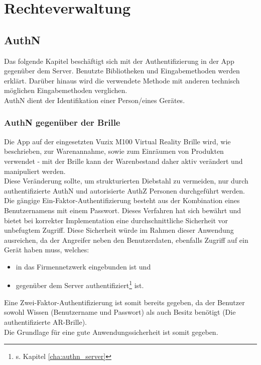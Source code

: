 \section{Rechteverwaltung}
\label{cha:rechteverwaltung_vr}

\subsection{\acf{AuthN}}
Das folgende Kapitel beschäftigt sich mit der Authentifizierung in der App gegenüber dem Server. Benutzte Bibliotheken und Eingabemethoden werden erklärt. Darüber hinaus wird die verwendete Methode mit anderen technisch möglichen Eingabemethoden verglichen.\\

\acl{AuthN} dient der Identifikation einer Person/eines Gerätes.

\subsubsection{\acs{AuthN} gegenüber der Brille}
Die App auf der eingesetzten Vuzix M100 Virtual Reality Brille wird, wie beschrieben, zur Warenannahme, sowie zum Einräumen von Produkten verwendet - mit der Brille kann der Warenbestand daher aktiv verändert und manipuliert werden.\\
Diese Veränderung sollte, um \zB strukturierten Diebstahl zu vermeiden, nur durch authentifizierte \acs{AuthN} und autorisierte \acs{AuthZ} Personen durchgeführt werden.\\

Die gängige Ein-Faktor-Authentifizierung besteht aus der Kombination eines Benutzernamens mit einem Passwort. Dieses Verfahren hat sich bewährt und bietet bei korrekter Implementation eine durchschnittliche Sicherheit vor unbefugtem Zugriff. Diese Sicherheit würde im Rahmen dieser Anwendung ausreichen, da der Angreifer neben den Benutzerdaten, ebenfalls Zugriff auf ein Gerät haben muss, welches:
\begin{itemize}
	\item in das Firmennetzwerk eingebunden ist und
	\item gegenüber dem Server authentifiziert\footnote{s. Kapitel \ref{cha:authn_server}} ist.
\end{itemize}
Eine Zwei-Faktor-Authentifizierung ist somit bereits gegeben, da der Benutzer sowohl Wissen (Benutzername und Passwort) als auch Besitz benötigt (Die authentifizierte \acl{AR}-Brille).\\
Die Grundlage für eine gute Anwendungssicherheit ist somit gegeben.

